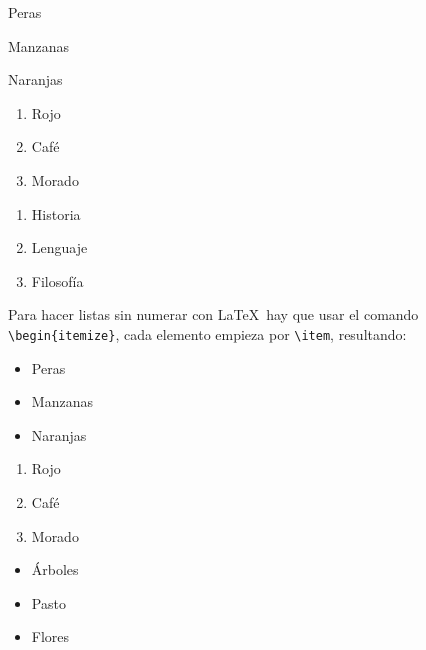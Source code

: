 	\begin{multicols}{3}
		\begin{enumeratebf}[label=\alph*) ] %
			\item Peras
			\item Manzanas
			\item Naranjas
		\end{enumeratebf}

		\begin{enumerate}[label=\roman*) ]
			\item Rojo
			\item Café
			\item Morado
		\end{enumerate}
		
		\begin{enumerate}[label=\greek*) ]
			\item Historia
			\item Lenguaje
			\item Filosofía
		\end{enumerate}
	\end{multicols}

	Para hacer listas sin numerar con \LaTeX\ hay que usar el comando \texttt{\textbackslash begin\{itemize\}}, cada elemento empieza por \texttt{\textbackslash item}, resultando:

	\begin{multicols}{3}
		\begin{itemize}[label={--}]
			\item Peras
			\item Manzanas
			\item Naranjas
		\end{itemize}

		\begin{enumerate}[label={*}]
			\item Rojo
			\item Café
			\item Morado
		\end{enumerate}

		\begin{itemize}
			\item Árboles
			\item Pasto
			\item Flores
		\end{itemize}
	\end{multicols}


